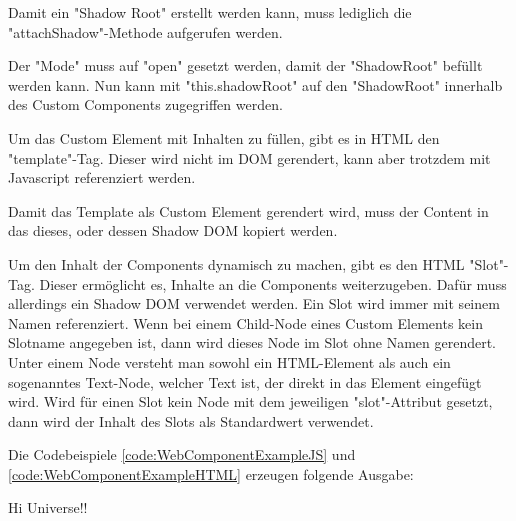 Damit ein "Shadow Root" erstellt werden kann, muss lediglich die "{\ttfamily attachShadow}"-Methode aufgerufen werden. \cite{MDNShadowRoot}


Der "Mode" muss auf "{\ttfamily open}" gesetzt werden, damit der "ShadowRoot" befüllt werden kann. Nun kann mit "{\ttfamily this.shadowRoot}" auf den "ShadowRoot" innerhalb des Custom Components zugegriffen werden.
\cite{MDNShadowRoot}

\pagebreak
{}

Um das Custom Element mit Inhalten zu füllen, gibt es in HTML den "template"-Tag. Dieser wird nicht im DOM gerendert, kann aber trotzdem mit Javascript referenziert werden. \cite{MDNtemplate}


Damit das Template als Custom Element gerendert wird, muss der Content in das dieses, oder dessen Shadow DOM kopiert werden.



Um den Inhalt der Components dynamisch zu machen, gibt es den HTML "Slot"-Tag. 
Dieser ermöglicht es, Inhalte an die Components weiterzugeben. 
Dafür muss allerdings ein Shadow DOM verwendet werden. 
Ein Slot wird immer mit seinem Namen referenziert. 
Wenn bei einem Child-Node eines Custom Elements kein Slotname angegeben ist, dann wird dieses Node im Slot ohne Namen gerendert. 
Unter einem Node versteht man sowohl ein HTML-Element als auch ein sogenanntes Text-Node, welcher Text ist, der direkt in das Element eingefügt wird. 
Wird für einen Slot kein Node mit dem jeweiligen "{\ttfamily slot}"-Attribut gesetzt, dann wird der Inhalt des Slots als Standardwert verwendet. 
\cite{MDNSlots}

\pagebreak
{}




Die Codebeispiele \ref{code:WebComponentExampleJS} und \ref{code:WebComponentExampleHTML} erzeugen folgende Ausgabe:

{\ttfamily Hi Universe!!}